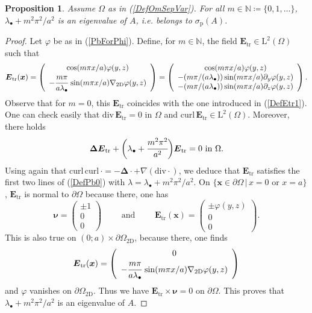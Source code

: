 \documentclass[11pt,a4paper]{article}
\newcommand{\Om}{\Omega}
\newcommand{\mrm}[1]{\mathrm{#1}}
\newcommand{\bfx}{\boldsymbol{x}}
\newcommand{\bfnu}{\boldsymbol{\nu}}
\newcommand{\N}{\mathbb{N}}
\newcommand{\mL}{\mrm{L}}
\newcommand{\curlvec}{\boldsymbol{\mrm{curl}}\,}
\renewcommand{\div}{\mrm{div}}
\def\E{\boldsymbol{E}}
\newtheorem{proposition}[theorem]{Proposition}
\begin{document}
\begin{proposition}\label{PropSeparationVaria}
Assume $\Om$ as in (\ref{DefOmSepVar}). For all $m\in\N\coloneqq\{0,1,\dots\}$, $\lambda_{\bullet}+m^2\pi^2/a^2$ is an eigenvalue of $A$, \textit{i.e.} belongs to $\sigma_{\mrm{p}}(A)$.
\end{proposition}
\begin{proof}
Let $\varphi$ be as in (\ref{PbForPhi}). Define, for $m\in\N$, the field $\E_{\mrm{tr}}\in\boldsymbol{\mL}^2(\Om)$ such that
\[
\E_{\mrm{tr}}(\bfx)=\left(\begin{array}{c}
\cos(m\pi x/a)\varphi(y,z)\\
-\cfrac{m\pi}{a\lambda_\bullet}\,\sin(m\pi x/a)\nabla_{\mrm{2D}}\varphi(y,z)
\end{array}\right)=\left(\begin{array}{c}
\cos(m\pi x/a)\varphi(y,z)\\
-(m\pi/(a\lambda_\bullet))\sin(m\pi x/a)\partial_y\varphi(y,z)\\
-(m\pi/(a\lambda_\bullet))\sin(m\pi x/a)\partial_z\varphi(y,z)
\end{array}\right).
\]
Observe that for $m=0$, this $\E_{\mrm{tr}}$ coincides with the one introduced in (\ref{DefEtr1}). One can check easily that $\div\,\E_{\mrm{tr}}=0$ in $\Om$ and $\curlvec\E_{\mrm{tr}}\in\boldsymbol{\mL}^2(\Om)$. Moreover, there holds 
\[
\boldsymbol{\Delta} \E_{\mrm{tr}}+\bigg(\lambda_\bullet+\cfrac{m^2\pi^2}{a^2}\bigg)\E_{\mrm{tr}}=0\mbox{  in }\Om. 
\] 
Using again that $\curlvec\curlvec\cdot=-\boldsymbol{\Delta}\cdot+\nabla(\div\cdot)$, we deduce that $\E_{\mrm{tr}}$ satisfies the first two lines of (\ref{DefPb0}) with $\lambda=\lambda_{\bullet}+m^2\pi^2/a^2$. On $\{\bfx\in\partial\Om\,|\,x=0\mbox{ or }x=a\}$, $\E_{\mrm{tr}}$ is normal to $\partial\Om$ because there, one has
\[
\bfnu=\left(\begin{array}{c}
\pm1\\
0\\
0
\end{array}\right)\qquad\mbox{ and }\qquad
\E_{\mrm{tr}}(\bfx)=\left(\begin{array}{c}
\pm\varphi(y,z)\\
0\\
0
\end{array}\right).
\]
This is also true on $(0;a)\times\partial\Om_{\mrm{2D}}$, because there, one finds 
\[
\E_{\mrm{tr}}(\bfx)=\left(\begin{array}{c}
0\\
-\cfrac{m\pi}{a\lambda_\bullet}\,\sin(m\pi x/a)\nabla_{\mrm{2D}}\varphi(y,z)
\end{array}\right)
\]
and $\varphi$ vanishes on $\partial\Om_{\mrm{2D}}$. Thus we have $\E_{\mrm{tr}}\times\bfnu=0$ on $\partial\Om$. This proves that $\lambda_{\bullet}+m^2\pi^2/a^2$ is an eigenvalue of $A$.
\end{proof}
\end{document}
